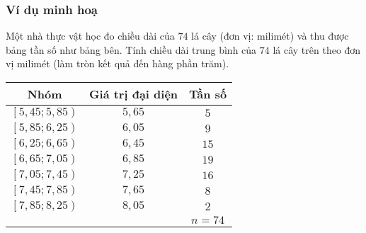 \subsubsection{Ví dụ minh hoạ}
\begin{vd}%
	\immini
	{
		Một nhà thực vật học đo chiều dài của $74$ lá cây (đơn vị: milimét) và thu được bảng tần số như bảng bên. Tính chiều dài trung bình của $74$ lá cây trên theo đơn vị milimét (làm tròn kết quả đến hàng phần trăm).
	}
	{
		\begin{tabular}{|c|c|c|}
			\hline
			\textbf{Nhóm}                & \textbf{Giá trị đại diện} & \textbf{Tần số} \\
			\hline
			$\left[5{,}45;5{,}85\right)$ & $5{,}65$                  & $5$             \\
			$\left[5{,}85;6{,}25\right)$ & $6{,}05$                  & $9$             \\
			$\left[6{,}25;6{,}65\right)$ & $6{,}45$                  & $15$            \\
			$\left[6{,}65;7{,}05\right)$ & $6{,}85$                  & $19$            \\
			$\left[7{,}05;7{,}45\right)$ & $7{,}25$                  & $16$            \\
			$\left[7{,}45;7{,}85\right)$ & $7{,}65$                  & $8$             \\
			$\left[7{,}85;8{,}25\right)$ & $8{,}05$                  & $2$             \\
			\hline
			                             &                           & $n = 74$        \\
			\hline
		\end{tabular}
	}
\end{vd}
